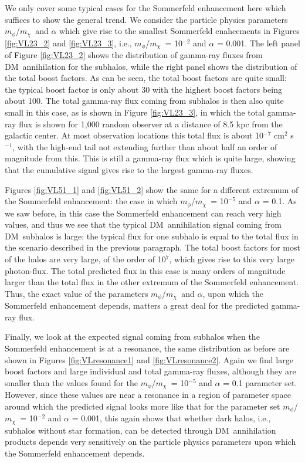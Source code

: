 \documentclass[aps,prd,twocolumn,amsmath,amssymb,floatfix,nofootinbib,10pt]{revtex4}
\newcommand{\ie}{i.e.}
\newcommand{\DM}{DM}
\newcommand{\mdm}{\ensuremath{m_{\chi}}}
\newcommand{\mv}{\ensuremath{m_{\phi}}}
\begin{document}
We only cover some typical cases for the Sommerfeld enhancement here
which suffices to show the general trend. We consider the particle
physics parameters \mv/\mdm\ and $\alpha$ which give rise to the
smallest Sommerfeld enahcements in Figures \ref{fig:VL23_2} and
\ref{fig:VL23_3}, \ie, \mv/\mdm\ = 10$^{-2}$ and $\alpha$ = 0.001. The
left panel of Figure \ref{fig:VL23_2} shows the distribution of
gamma-ray fluxes from \DM\ annihilation for the subhalos, while the
right panel shows the distribution of the total boost factors. As can
be seen, the total boost factors are quite small: the typical boost
factor is only about 30 with the highest boost factors being about
100. The total gamma-ray flux coming from subhalos is then also quite
small in this case, as is shown in Figure \ref{fig:VL23_3}, in which
the total gamma-ray flux is shown for 1,000 random observer at a
distance of 8.5 kpc from the galactic center. At most observation
locations this total flux is about 10$^{-7}$ cm$^2$ s$^{-1}$, with the
high-end tail not extending further than about half an order of
magnitude from this. This is still a gamma-ray flux which is quite
large, showing that the cumulative signal gives rise to the largest
gamma-ray fluxes.

Figures \ref{fig:VL51_1} and \ref{fig:VL51_2} show the same for a
different extremum of the Sommerfeld enhancement: the case in which
\mv/\mdm\ = 10$^{-5}$ and $\alpha$ = 0.1. As we saw before, in this
case the Sommerfeld enhancement can reach very high values, and thus
we see that the typical \DM\ annihilation signal coming from \DM\
subhalos is large: the typical flux for one subhalo is equal to the
total flux in the scenario described in the previous paragraph. The
total boost factors for most of the halos are very large, of the order
of 10$^7$, which gives rise to this very large photon-flux. The total
predicted flux in this case is many orders of magnitude larger than
the total flux in the other extremum of the Sommerfeld
enhancement. Thus, the exact value of the parameters \mv/\mdm\ and
$\alpha$, upon which the Sommerfeld enhancement depends, matters a
great deal for the predicted gamma-ray flux.

Finally, we look at the expected signal coming from subhalos when the
Sommerfeld enhancement is at a resonance, the same distribution as
before are shown in Figures \ref{fig:VLresonance1} and
\ref{fig:VLresonance2}. Again we find large boost factors and large
individual and total gamma-ray fluxes, although they are smaller than
the values found for the \mv/\mdm\ = 10$^{-5}$ and $\alpha$ = 0.1
parameter set. However, since these values are near a resonance in a
region of parameter space around which the predicted signal looks more
like that for the parameter set \mv/\mdm\ = 10$^{-2}$ and $\alpha$ =
0.001, this again shows that whether dark halos, \ie, subhalos without
star formation, can be detected through \DM\ annihilation products
depends very sensitively on the particle physics parameters upon which
the Sommerfeld enhancement depends.
\end{document}
